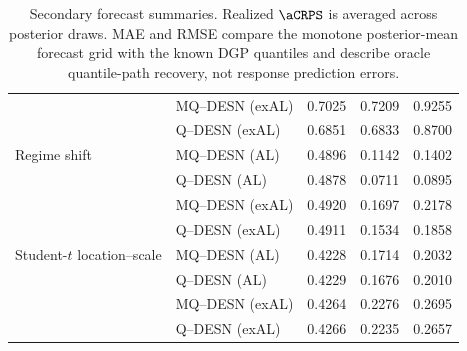 \begin{table}[!htbp]
\begin{tabular}{@{}>{\raggedright\arraybackslash}p{}lrrr@{}}
 & MQ--DESN (exAL) & 0.7025 & 0.7209 & 0.9255 \\
 & Q--DESN (exAL) & 0.6851 & 0.6833 & 0.8700 \\
\addlinespace[2pt]
Regime shift & MQ--DESN (AL) & 0.4896 & 0.1142 & 0.1402 \\
 & Q--DESN (AL) & 0.4878 & 0.0711 & 0.0895 \\
 & MQ--DESN (exAL) & 0.4920 & 0.1697 & 0.2178 \\
 & Q--DESN (exAL) & 0.4911 & 0.1534 & 0.1858 \\
\addlinespace[2pt]
Student-\(t\) location--scale & MQ--DESN (AL) & 0.4228 & 0.1714 & 0.2032 \\
 & Q--DESN (AL) & 0.4229 & 0.1676 & 0.2010 \\
 & MQ--DESN (exAL) & 0.4264 & 0.2276 & 0.2695 \\
 & Q--DESN (exAL) & 0.4266 & 0.2235 & 0.2657 \\
\bottomrule
\end{tabular}
\caption{Secondary forecast summaries. Realized \(\aCRPS\) is averaged across posterior draws. MAE and RMSE compare the monotone posterior-mean forecast grid with the known DGP quantiles and describe oracle quantile-path recovery, not response prediction errors.}
\label{tab:joint-qdesn-pure-desn-v2-secondary}
\end{table}
